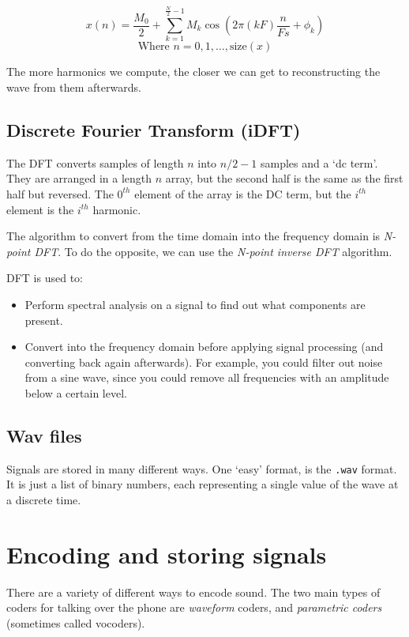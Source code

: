 \[
  x(n) = \frac{M_0}{2} + \sum\limits^{\frac{N}{2}-1}_{k=1}M_k\cos\left(2\pi (kF)\frac{n}{Fs} + \phi_k\right)
\]
\[
  \text{Where } n = 0,1,\dots,\text{size}(x)
\]

The more harmonics we compute, the closer we can get to reconstructing the wave
from them afterwards.

\subsection{Discrete Fourier Transform (iDFT)}

The DFT converts samples of length $n$ into $n/2 - 1$ samples and a `dc term'.
They are arranged in a length $n$ array, but the second half is the same as the
first half but reversed. The $0^{th}$ element of the array is the DC term, but
the $i^{th}$ element is the $i^{th}$ harmonic. 

The algorithm to convert from the time domain into the frequency domain is
\textit{N-point DFT}. To do the opposite, we can use the \textit{N-point inverse
DFT} algorithm.

DFT is used to:

\begin{itemize}
  \item Perform spectral analysis on a signal to find out what components are 
    present.
  \item Convert into the frequency domain before applying signal processing (and
    converting back again afterwards). For example, you could filter out noise 
    from a sine wave, since you could remove all frequencies with an amplitude
    below a certain level.
\end{itemize}

\subsection{Wav files}

Signals are stored in many different ways. One `easy' format, is the
\texttt{.wav} format. It is just a list of binary numbers, each representing a
single value of the wave at a discrete time.



\section{Encoding and storing signals}

There are a variety of different ways to encode sound. The two main types of
coders for talking over the phone are \textit{waveform} coders, and
\textit{parametric coders} (sometimes called vocoders).

